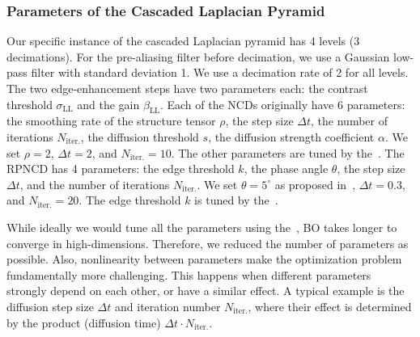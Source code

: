 \subsubsection{Parameters of the Cascaded Laplacian Pyramid}
Our specific instance of the cascaded Laplacian pyramid has 4 levels (3 decimations).
For the pre-aliasing filter before decimation, we use a Gaussian low-pass filter with standard deviation 1.
We use a decimation rate of 2 for all levels.
The two edge-enhancement steps have two parameters each: the contrast threshold \(\sigma_{\mathrm{LL}}\) and the gain \(\beta_{\mathrm{LL}}\).
Each of the NCDs originally have 6 parameters: the smoothing rate of the structure tensor \(\rho\), the step size \(\Delta t\), the number of iterations \(N_{\text{iter.}}\), the diffusion threshold \(s\), the diffusion strength coefficient \(\alpha\).
We set \(\rho = 2\), \(\Delta t = 2\), and \(N_{\text{iter.}} = 10\).
The other parameters are tuned by the~\usdg.
The RPNCD has 4 parameters: the edge threshold \(k\), the phase angle \(\theta\), the step size \(\Delta t\), and the number of iterations \(N_{\text{iter.}}\).
We set \(\theta = 5^{\circ}\) as proposed in~\cite{gilboa_image_2004}, \(\Delta t = 0.3\), and \(N_{\text{iter.}} = 20\).
The edge threshold \(k\) is tuned by the~\usdg.

While ideally we would tune all the parameters using the~\usdg, BO takes longer to converge in high-dimensions.
Therefore, we reduced the number of parameters as possible.
Also, nonlinearity between parameters make the optimization problem fundamentally more challenging.
This happens when different parameters strongly depend on each other, or have a similar effect.
A typical example is the diffusion step size \(\Delta t\) and iteration number \(N_{\text{iter.}}\), where their effect is determined by the product (diffusion time) \(\Delta t \cdot N_{\text{iter.}}\).

